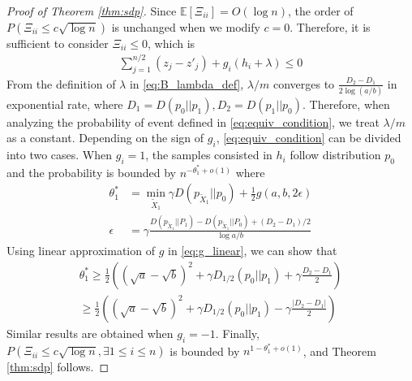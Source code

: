 \documentclass[conference]{IEEEtran}
\begin{document}
\begin{proof}[Proof of Theorem \ref{thm:sdp}]
Since $\mathbb{E}[\Xi_{ii}]=O(\log n)$, the order of $P(\Xi_{ii} \leq c\sqrt{\log n})$ is unchanged when we modify $c=0$. Therefore, it is sufficient to consider $\Xi_{ii} \leq 0 $, which is
\begin{align}\label{eq:equiv_condition}
\sum_{j=1}^{n/2} (z_j - z'_j) +g_i( h_i + \lambda )\leq 0
\end{align}
From the definition of $\lambda$ in \eqref{eq:B_lambda_def}, $\lambda/m$ converges to $\frac{D_2-D_1}{2 \log(a/b)}$ in exponential rate, where $D_1 = D(p_0||p_1),
D_2 = D(p_1||p_0)$.
Therefore, when analyzing the probability of event defined in \eqref{eq:equiv_condition}, we treat $\lambda/m$ as a constant. 
Depending on the sign of $g_i$, \eqref{eq:equiv_condition} can be divided into two cases. When $g_i=1$, the samples consisted in $h_i$
follow distribution $p_0$ and the probability is bounded by $n^{-\theta^*_1 + o(1)}$ where
\begin{align}
\theta^*_1 &= \min_{\widetilde{X}_1} \gamma D(p_{\widetilde{X}_1}|| p_0)+ \frac{1}{2} g(a,b, 2\epsilon) \label{eq:theta_star2} \\
\epsilon &= \gamma \frac{D(p_{\widetilde{X}_1} || P_1) - D(p_{\widetilde{X}_1} || P_0) + (D_2 - D_1)/2}{\log a /b}
\end{align}
Using linear approximation of $g$ in \eqref{eq:g_linear}, we can show that 
\begin{align*}
\theta^*_1 \geq \frac{1}{2}((\sqrt{a}-\sqrt{b})^2+\gamma D_{1/2}(p_0||p_1)+\gamma\frac{D_2-D_1}{2}) \\
\geq \frac{1}{2}((\sqrt{a}-\sqrt{b})^2+\gamma D_{1/2}(p_0||p_1)-\gamma\frac{|D_2-D_1|}{2})
\end{align*}
Similar results are obtained when $g_i=-1$. Finally,
$P(\Xi_{ii} \leq c\sqrt{\log n}, \exists 1\leq i \leq n)$ is bounded by $n^{1-\theta_1^*+o(1)}$, and Theorem \ref{thm:sdp} follows.
\end{proof}



\end{document}
